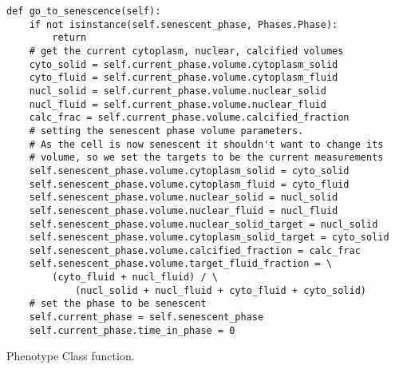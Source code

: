 \begin{listing}[H]
\begin{verbatim}
def go_to_senescence(self):
    if not isinstance(self.senescent_phase, Phases.Phase):
        return
    # get the current cytoplasm, nuclear, calcified volumes
    cyto_solid = self.current_phase.volume.cytoplasm_solid
    cyto_fluid = self.current_phase.volume.cytoplasm_fluid
    nucl_solid = self.current_phase.volume.nuclear_solid
    nucl_fluid = self.current_phase.volume.nuclear_fluid
    calc_frac = self.current_phase.volume.calcified_fraction
    # setting the senescent phase volume parameters. 
    # As the cell is now senescent it shouldn't want to change its
    # volume, so we set the targets to be the current measurements
    self.senescent_phase.volume.cytoplasm_solid = cyto_solid
    self.senescent_phase.volume.cytoplasm_fluid = cyto_fluid
    self.senescent_phase.volume.nuclear_solid = nucl_solid
    self.senescent_phase.volume.nuclear_fluid = nucl_fluid
    self.senescent_phase.volume.nuclear_solid_target = nucl_solid
    self.senescent_phase.volume.cytoplasm_solid_target = cyto_solid
    self.senescent_phase.volume.calcified_fraction = calc_frac
    self.senescent_phase.volume.target_fluid_fraction = \
        (cyto_fluid + nucl_fluid) / \ 
            (nucl_solid + nucl_fluid + cyto_fluid + cyto_solid)
    # set the phase to be senescent
    self.current_phase = self.senescent_phase
    self.current_phase.time_in_phase = 0
\end{verbatim}
\caption{Phenotype Class  function.}\label{code:pheno:quies}
\end{listing}



